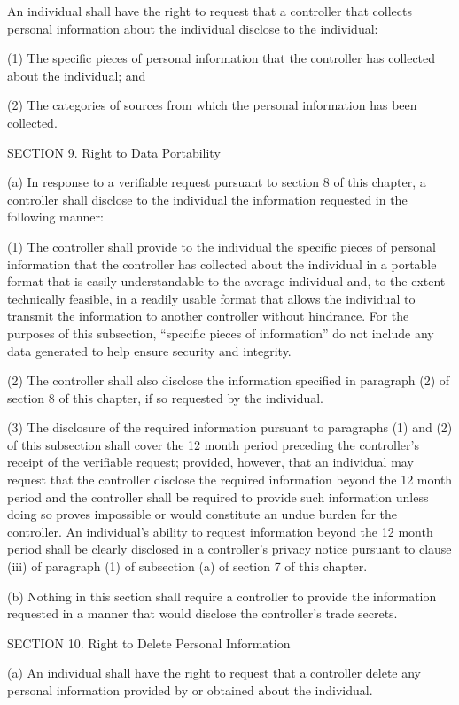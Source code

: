 An individual shall have the right to request that a controller that collects personal information about the individual disclose to the individual:

(1) The specific pieces of personal information that the controller has collected about the individual; and

(2) The categories of sources from which the personal information has been collected.

SECTION 9. Right to Data Portability

(a) In response to a verifiable request pursuant to section 8 of this chapter, a controller shall disclose to the individual the information requested in the following manner:

(1) The controller shall provide to the individual the specific pieces of personal information that the controller has collected about the individual in a portable format that is easily understandable to the average individual and, to the extent technically feasible, in a readily usable format that allows the individual to transmit the information to another controller without hindrance. For the purposes of this subsection, “specific pieces of information” do not include any data generated to help ensure security and integrity.

(2) The controller shall also disclose the information specified in paragraph (2) of section 8 of this chapter, if so requested by the individual. 

(3) The disclosure of the required information pursuant to paragraphs (1) and (2) of this subsection shall cover the 12 month period preceding the controller’s receipt of the verifiable request; provided, however, that an individual may request that the controller disclose the required information beyond the 12 month period and the controller shall be required to provide such information unless doing so proves impossible or would constitute an undue burden for the controller. An individual’s ability to request information beyond the 12 month period shall be clearly disclosed in a controller’s privacy notice pursuant to clause (iii) of paragraph (1) of subsection (a) of section 7 of this chapter. 

(b) Nothing in this section shall require a controller to provide the information requested in a manner that would disclose the controller’s trade secrets. 

SECTION 10. Right to Delete Personal Information

(a) An individual shall have the right to request that a controller delete any personal information provided by or obtained about the individual.

